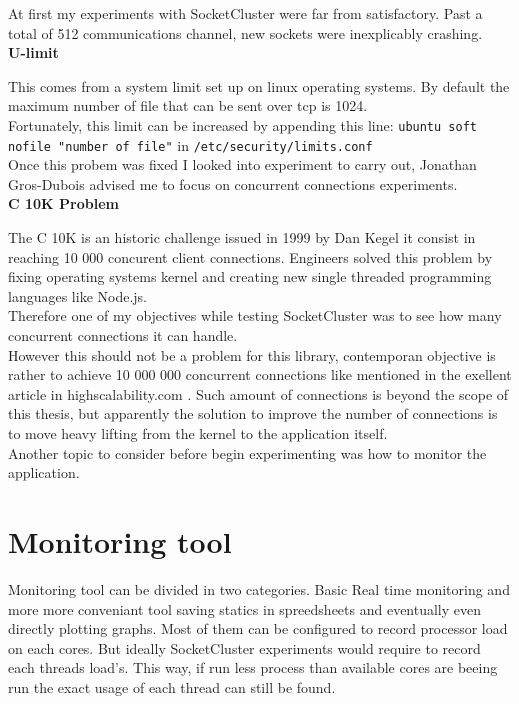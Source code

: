 At first my experiments with SocketCluster were far from satisfactory. Past a
total of 512 communications channel, new sockets were inexplicably crashing.\\

\textbf{U-limit}

This comes from a system limit set up on linux operating systems. By default
the maximum number of file that can be sent over tcp is 1024. \\

Fortunately, this limit can be increased by appending this line: \texttt{ubuntu
soft nofile "number of file"} in \texttt{/etc/security/limits.conf}\\

Once this probem was fixed I looked into experiment to carry out, Jonathan Gros-Dubois
advised me to focus on concurrent connections experiments.\\

\textbf{C 10K Problem}

The C 10K is an historic challenge issued in 1999 by Dan Kegel it consist in
reaching 10 000 concurent client connections. Engineers solved this problem by
fixing operating systems kernel and creating new single threaded programming
languages like Node.js. \\

Therefore one of my objectives while testing SocketCluster was to see how many
concurrent connections it can handle.\\

However this should not be a problem for this library, contemporan objective is
rather to achieve 10 000 000 concurrent connections like mentioned in the
exellent article in highscalability.com \citep{Reference39}. Such amount of
connections is beyond the scope of this thesis, but apparently the solution to
improve the number of connections is to move heavy lifting from the kernel to
the application itself.\\

Another topic to consider before begin experimenting was how to monitor the
application.\\ 

\section{Monitoring tool}

Monitoring tool can be divided in two categories. Basic Real time monitoring
and more more conveniant tool saving statics in spreedsheets and eventually
even directly plotting graphs. Most of them can be configured to record
processor load on each cores. But ideally SocketCluster experiments would
require to record each threads load's. This way, if run less process than
available cores are beeing run the exact usage of each thread can still be 
found.\\

